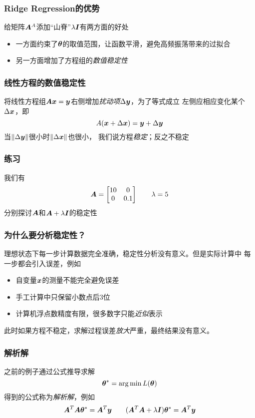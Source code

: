 \documentclass[14pt]{beamer}
\begin{document}
\begin{frame}
  \frametitle{Ridge Regression的优势}
  给矩阵$\bm{A}^A$添加“山脊”$\lambda\bm{I}$有两方面的好处
  \begin{itemize}
    \item 一方面约束了$\bm{\theta}$的取值范围，让函数平滑，避免高频振荡带来的过拟合
    \item 另一方面增加了方程组的\emph{数值稳定性}
  \end{itemize}
\end{frame}

\begin{frame}
  \frametitle{线性方程的数值稳定性}
  将线性方程组$\bm{A}\bm{x}=\bm{y}$右侧增加\emph{扰动项}$\Delta\bm{y}$，为了等式成立
  左侧应相应变化某个$\Delta\bm{x}$，即
  \begin{equation}
    A(\bm{x}+\Delta\bm{x})=\bm{y}+\Delta\bm{y}
  \end{equation}
  当$\|\Delta\bm{y}\|$很小时$\|\Delta\bm{x}\|$也很小，
  我们说方程\emph{稳定}；反之不稳定
\end{frame}

\begin{frame}
  \frametitle{练习}
  我们有\[\bm{A}=\begin{bmatrix}
    10 & 0\\
    0 & 0.1
  \end{bmatrix}\qquad
  \lambda = 5
  \]
  分别探讨$\bm{A}$和$\bm{A}+\lambda\bm{I}$的稳定性
\end{frame}

\begin{frame}
  \frametitle{为什么要分析稳定性？}
  理想状态下每一步计算数据完全准确，稳定性分析没有意义。但是实际计算中
  每一步都会引入误差，例如
  \begin{itemize}
    \item 自变量$\bm{x}$的测量不能完全避免误差
    \item 手工计算中只保留小数点后3位
    \item 计算机浮点数精度有限，很多数字只能\emph{近似}表示
  \end{itemize}

  此时如果方程不稳定，求解过程误差\emph{放大}严重，最终结果没有意义。
\end{frame}

\begin{frame}
  \frametitle{解析解}
  之前的例子通过公式推导求解
  $$\bm{\theta}^*=\operatorname*{arg\,min} L(\bm{\theta})$$
  得到的公式称为\emph{解析解}，例如
  \begin{equation*}
    \bm{A}^T\bm{A}\bm{\theta}^*=\bm{A}^T\bm{y} \qquad (\bm{A}^T\bm{A}+\lambda\bm{I})\bm{\theta}^*=\bm{A}^T\bm{y}
  \end{equation*}
\end{frame}
\end{document}
